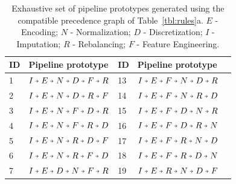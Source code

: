 \begin{table}[t]
\caption[Enumeration of the pipelines that can be generated by compatible precedence]{Exhaustive set of pipeline prototypes generated using the compatible precedence graph of Table~\ref{tbl:rules}a. $E$ - Encoding; $N$ - Normalization; $D$ - Discretization; $I$ - Imputation; $R$ - Rebalancing; $F$ - Feature Engineering.
}
\footnotesize
\label{tbl:pipeline-enumeration}
\begin{center}
\begin{tabular}{@{}lllll@{}}
\toprule
ID & Pipeline prototype & ID & Pipeline prototype                                                                   \\ \toprule
1  & {\color[HTML]{000000} $I\veryshortarrow E\veryshortarrow N \veryshortarrow D\veryshortarrow F \veryshortarrow R$} & 13 & {\color[HTML]{000000} $I\veryshortarrow E \veryshortarrow F \veryshortarrow N \veryshortarrow D\veryshortarrow R$} \\
2  & {\color[HTML]{000000} $I\veryshortarrow E\veryshortarrow N \veryshortarrow D\veryshortarrow R \veryshortarrow F$} & 14 & {\color[HTML]{000000} $I\veryshortarrow E \veryshortarrow F \veryshortarrow N \veryshortarrow R \veryshortarrow D$} \\
3  & {\color[HTML]{000000} $I\veryshortarrow E\veryshortarrow N \veryshortarrow F \veryshortarrow D\veryshortarrow R$} & 15 & {\color[HTML]{000000} $I\veryshortarrow E \veryshortarrow F \veryshortarrow D\veryshortarrow N \veryshortarrow R$} \\
4  & {\color[HTML]{000000} $I\veryshortarrow E\veryshortarrow N \veryshortarrow F \veryshortarrow R \veryshortarrow D$} & 16 & {\color[HTML]{000000} $I\veryshortarrow E \veryshortarrow F \veryshortarrow D\veryshortarrow R \veryshortarrow N$} \\
5  & {\color[HTML]{000000} $I\veryshortarrow E\veryshortarrow N \veryshortarrow R \veryshortarrow D\veryshortarrow F$} & 17 & {\color[HTML]{000000} $I\veryshortarrow E \veryshortarrow F \veryshortarrow R \veryshortarrow N \veryshortarrow D$} \\
6  & {\color[HTML]{000000} $I\veryshortarrow E\veryshortarrow N \veryshortarrow R \veryshortarrow F \veryshortarrow D$} & 18 & {\color[HTML]{000000} $I\veryshortarrow E \veryshortarrow F \veryshortarrow R \veryshortarrow D\veryshortarrow N$} \\
7  & {\color[HTML]{000000} $I\veryshortarrow E \veryshortarrow D\veryshortarrow N \veryshortarrow F \veryshortarrow R$} & 19 & {\color[HTML]{000000} $I\veryshortarrow E \veryshortarrow R \veryshortarrow N \veryshortarrow D \veryshortarrow F$} \\

\end{tabular}
\end{center}
\end{table}
